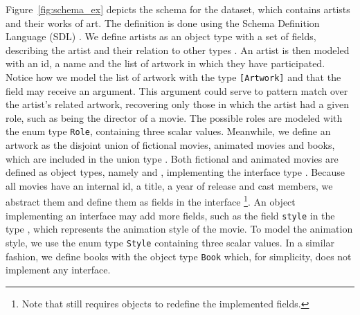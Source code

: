 Figure~\ref{fig:schema_ex} depicts the schema for the \goodbois dataset, which contains
artists and their works of art. The definition is done using the \gql
Schema Definition Language (SDL) .
We define artists as an object type with a set of fields, describing the artist and their relation
to other types . An artist is then modeled with an id, a name and the list of artwork
in which they have participated. Notice how we model the list of artwork with the type 
\texttt{[Artwork]} and that the field may receive an argument. 
This argument could serve to pattern match over the artist's related artwork, 
recovering only those in which the artist had a given role, such as being the director of a movie. 
The possible roles are modeled with the enum type \texttt{Role}, containing three scalar values.
Meanwhile, we define an artwork as the disjoint union of fictional movies, animated movies and books,
which are included in the union type \artwork.
Both fictional and animated movies are defined as object types, namely \fiction and 
\animation, implementing the interface type \movies. 
Because all movies have an internal id, a title, a year of release and cast members, we 
abstract them and define them as fields in the interface \movies\footnote{Note that \gql still requires objects to redefine the implemented fields.}.
An object implementing an interface may add more fields, such as the field \texttt{style} in the type \animation, which
represents the animation style of the movie. 
To model the animation style, we use the enum type \texttt{Style} containing
three scalar values. 
In a similar fashion, we define books with the object type \texttt{Book} which, for simplicity, 
does not implement any interface.


